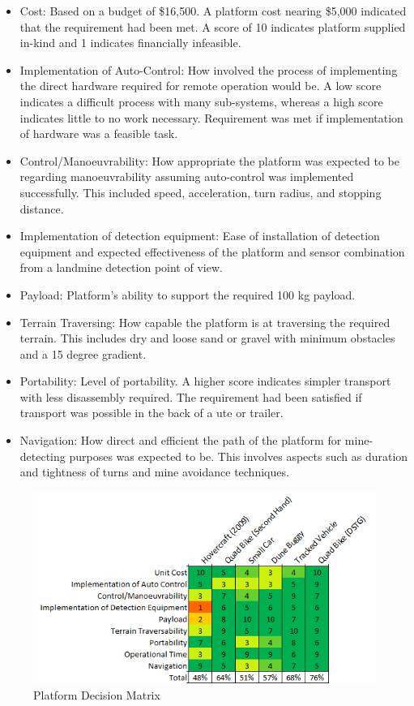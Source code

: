 \documentclass[main.tex]{subfiles}
\begin{document}
\begin{itemize}
\item Cost: Based on a budget of \$16,500. A platform cost nearing \$5,000 indicated that the requirement had been met. A score of 10 indicates platform supplied in-kind and 1 indicates financially infeasible.
\item Implementation of Auto-Control: How involved the process of implementing the direct hardware required for remote operation would be. A low score indicates a difficult process with many sub-systems, whereas a high score indicates little to no work necessary. Requirement was met if implementation of hardware was a feasible task.
\item Control/Manoeuvrability: How appropriate the platform was expected to be regarding manoeuvrability assuming auto-control was implemented successfully. This included speed, acceleration, turn radius, and stopping distance.
\item Implementation of detection equipment: Ease of installation of detection equipment and expected effectiveness of the platform and sensor combination from a landmine detection point of view.
\item Payload: Platform's ability to support the required 100 kg payload.
\item Terrain Traversing: How capable the platform is at traversing the required terrain. This includes dry and loose sand or gravel with minimum obstacles and a 15 degree gradient.
\item Portability: Level of portability. A higher score indicates simpler transport with less disassembly required. The requirement had been satisfied if transport was possible in the back of a ute or trailer.
\item Navigation: How direct and efficient the path of the platform for mine-detecting purposes was expected to be. This involves aspects such as duration and tightness of turns and mine avoidance techniques.
\end{itemize}

\begin{figure}[ht]
\includegraphics{4-ConceptDesign/platformDecision.png}
\centering
\caption{Platform Decision Matrix} 
\end{figure}
\end{document}
